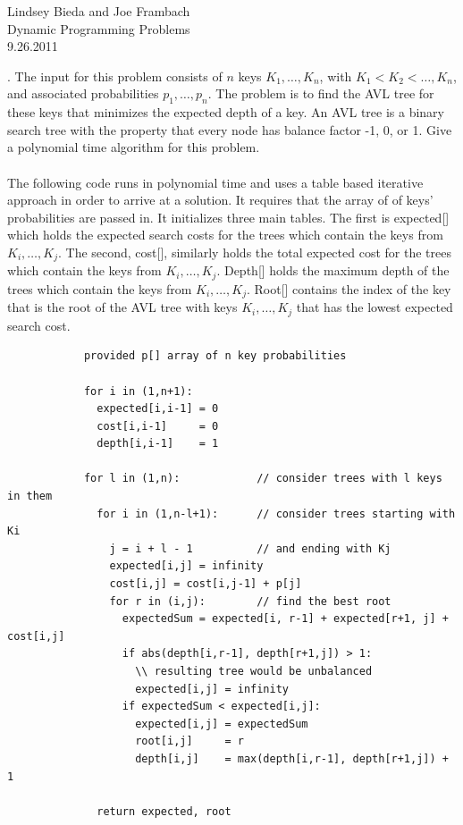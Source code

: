 \documentclass[10pt]{article}
\begin{document}
	\begin{flushright}
	Lindsey Bieda and Joe Frambach\\
	Dynamic Programming Problems\\
	9.26.2011
	\end{flushright}
	.	The input for this problem consists of $n$ keys $K_1, \ldots, K_n$, with $K_1 < K_2 < \ldots , K_n$, and associated
			probabilities $p_1, \ldots, p_n$. The problem is to find the AVL tree for these keys that minimizes the expected
			depth of a key.  An AVL tree is a binary search tree with the property that every node has balance
			factor -1, 0, or 1. Give a polynomial time algorithm for this problem.\\
			\\
			The following code runs in polynomial time and uses a table based iterative approach in order to arrive at a solution.
			It requires that the array of of keys' probabilities are passed in. It initializes three main tables. The first
			is expected[] which holds the expected search costs for the trees which contain the keys from $K_i, \ldots, K_j$.
			The second, cost[], similarly holds the total expected cost for the trees which contain the keys from $K_i, \ldots, K_j$.
			Depth[] holds the maximum depth of the trees which contain the keys from $K_i, \ldots, K_j$. Root[] contains the index
			of the key that is the root of the AVL tree with keys $K_i, \ldots, K_j$ that has the lowest expected search cost.
			\begin{verbatim}
			provided p[] array of n key probabilities 
			 
			for i in (1,n+1):
			  expected[i,i-1] = 0
			  cost[i,i-1]     = 0
			  depth[i,i-1]    = 1
			  
			for l in (1,n):            // consider trees with l keys in them
			  for i in (1,n-l+1):      // consider trees starting with Ki 
			    j = i + l - 1          // and ending with Kj
			    expected[i,j] = infinity
			    cost[i,j] = cost[i,j-1] + p[j]
			    for r in (i,j):        // find the best root
			      expectedSum = expected[i, r-1] + expected[r+1, j] + cost[i,j]
			      if abs(depth[i,r-1], depth[r+1,j]) > 1:
			        \\ resulting tree would be unbalanced
			        expected[i,j] = infinity
			      if expectedSum < expected[i,j]:
			        expected[i,j] = expectedSum
			        root[i,j]     = r
			        depth[i,j]    = max(depth[i,r-1], depth[r+1,j]) + 1
			        
			  return expected, root
			\end{verbatim}
			
\end{document}
